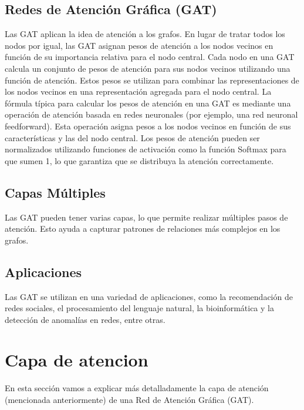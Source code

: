 \documentclass{article}
\begin{document}
\subsection{Redes de Atención Gráfica (GAT)}

Las GAT aplican la idea de atención a los grafos. En lugar de tratar todos los nodos por igual, las GAT asignan pesos de atención a los nodos vecinos en función de su importancia relativa para el nodo central. Cada nodo en una GAT calcula un conjunto de pesos de atención para sus nodos vecinos utilizando una función de atención. Estos pesos se utilizan para combinar las representaciones de los nodos vecinos en una representación agregada para el nodo central. La fórmula típica para calcular los pesos de atención en una GAT es mediante una operación de atención basada en redes neuronales (por ejemplo, una red neuronal feedforward). Esta operación asigna pesos a los nodos vecinos en función de sus características y las del nodo central. Los pesos de atención pueden ser normalizados utilizando funciones de activación como la función Softmax para que sumen 1, lo que garantiza que se distribuya la atención correctamente.

\subsection{Capas Múltiples}

Las GAT pueden tener varias capas, lo que permite realizar múltiples pasos de atención. Esto ayuda a capturar patrones de relaciones más complejos en los grafos.

\subsection{Aplicaciones}

Las GAT se utilizan en una variedad de aplicaciones, como la recomendación de redes sociales, el procesamiento del lenguaje natural, la bioinformática y la detección de anomalías en redes, entre otras.

\vspace{1cm}

\section{Capa de atencion}

\vspace{1cm}

En esta sección vamos a explicar más detalladamente la capa de atención (mencionada anteriormente) de una Red de Atención Gráfica (GAT).
\end{document}
